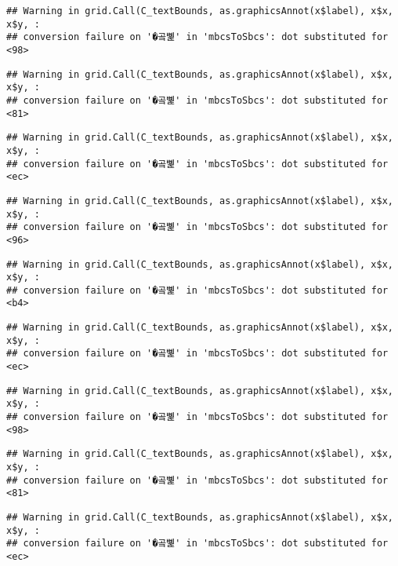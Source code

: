 \documentclass[
]{article}
\begin{document}
\begin{verbatim}
## Warning in grid.Call(C_textBounds, as.graphicsAnnot(x$label), x$x, x$y, :
## conversion failure on '�곸뼱' in 'mbcsToSbcs': dot substituted for <98>
\end{verbatim}

\begin{verbatim}
## Warning in grid.Call(C_textBounds, as.graphicsAnnot(x$label), x$x, x$y, :
## conversion failure on '�곸뼱' in 'mbcsToSbcs': dot substituted for <81>
\end{verbatim}

\begin{verbatim}
## Warning in grid.Call(C_textBounds, as.graphicsAnnot(x$label), x$x, x$y, :
## conversion failure on '�곸뼱' in 'mbcsToSbcs': dot substituted for <ec>
\end{verbatim}

\begin{verbatim}
## Warning in grid.Call(C_textBounds, as.graphicsAnnot(x$label), x$x, x$y, :
## conversion failure on '�곸뼱' in 'mbcsToSbcs': dot substituted for <96>
\end{verbatim}

\begin{verbatim}
## Warning in grid.Call(C_textBounds, as.graphicsAnnot(x$label), x$x, x$y, :
## conversion failure on '�곸뼱' in 'mbcsToSbcs': dot substituted for <b4>
\end{verbatim}

\begin{verbatim}
## Warning in grid.Call(C_textBounds, as.graphicsAnnot(x$label), x$x, x$y, :
## conversion failure on '�곸뼱' in 'mbcsToSbcs': dot substituted for <ec>
\end{verbatim}

\begin{verbatim}
## Warning in grid.Call(C_textBounds, as.graphicsAnnot(x$label), x$x, x$y, :
## conversion failure on '�곸뼱' in 'mbcsToSbcs': dot substituted for <98>
\end{verbatim}

\begin{verbatim}
## Warning in grid.Call(C_textBounds, as.graphicsAnnot(x$label), x$x, x$y, :
## conversion failure on '�곸뼱' in 'mbcsToSbcs': dot substituted for <81>
\end{verbatim}

\begin{verbatim}
## Warning in grid.Call(C_textBounds, as.graphicsAnnot(x$label), x$x, x$y, :
## conversion failure on '�곸뼱' in 'mbcsToSbcs': dot substituted for <ec>
\end{verbatim}
\end{document}
